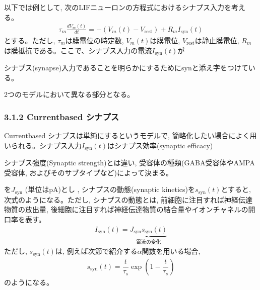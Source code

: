 \documentclass[letterpaper,10pt,english]{sphinxmanual}
\begin{document}
以下では例として, 次のLIFニューロンの方程式におけるシナプス入力を考える。
\begin{equation*}
\begin{split}
\tau_m \frac{dV_{m}(t)}{dt}=-(V_{m}(t)-V_\text{rest})+R_m I_{\text{syn}}(t)    
\end{split}
\end{equation*}
とする。ただし, \(\tau_m\)は膜電位の時定数, \(V_m(t)\)は膜電位, \(V_\text{rest}\)は静止膜電位, \(R_m\)は膜抵抗である。ここで、シナプス入力の電流\(I_{\text{syn}}(t)\)が%
\begin{footnote}[1]\sphinxAtStartFootnote
シナプス(synapse)入力であることを明らかにするためにsynと添え字をつけている。
%
\end{footnote}2つのモデルにおいて異なる部分となる。


\subsubsection{3.1.2 Current\sphinxhyphen{}based シナプス}
\label{\detokenize{3-2_current-conductance-synapse:current-based}}
Current\sphinxhyphen{}based シナプスは単純にするというモデルで, 簡略化したい場合によく用いられる。シナプス入力\(I_{\text{syn}}(t)\)はシナプス効率(synaptic efficacy)%
\begin{footnote}[2]\sphinxAtStartFootnote
シナプス強度(Synaptic strength)とは違い, 受容体の種類(GABA受容体やAMPA受容体,  およびそのサブタイプなど)によって決まる。
%
\end{footnote}を\(J_{\text{syn}}\) (単位はpA)とし , シナプスの動態(synaptic kinetics)を\(s_{\text{syn}}(t)\)とすると, 次式のようになる。ただし, シナプスの動態とは, 前細胞に注目すれば神経伝達物質の放出量, 後細胞に注目すれば神経伝達物質の結合量やイオンチャネルの開口率を表す。
\begin{equation*}
\begin{split}
\begin{equation}
I_{\text{syn}}(t)=\underbrace{J_{\text{syn}}s_{\text{syn}}(t)}_{電流の変化}    
\end{equation}
\end{split}
\end{equation*}
ただし, \(s_{\text{syn}}(t)\)は, 例えば次節で紹介する\(\alpha\)関数を用いる場合,
\begin{equation*}
\begin{split}
\begin{equation}
s_{\text{syn}}(t)=\dfrac{t}{\tau_s} \exp \left(1-\dfrac{t}{\tau_s}\right)    
\end{equation}
\end{split}
\end{equation*}
のようになる。
\end{document}
